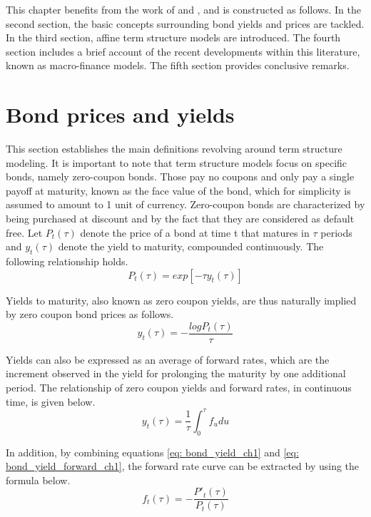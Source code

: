 This chapter benefits from the work of \cite{piazzesi_2010} and \cite{diebold_book}, and is constructed as follows. In the second section, the basic concepts surrounding bond yields and prices are tackled. In the third section, affine term structure models are introduced. The fourth section includes a brief account of the recent developments within this literature, known as macro-finance models. The fifth section provides conclusive remarks. 


\section{Bond prices and yields}

This section establishes the main definitions revolving around term structure modeling. It is important to note that term structure models focus on specific bonds, namely zero-coupon bonds. Those pay no coupons and only pay a single payoff at maturity, known as the face value of the bond, which for simplicity is assumed to amount to 1 unit of currency. Zero-coupon bonds are characterized by being purchased at discount and by the fact that they are considered as default free. Let \(P_t(\tau)\) denote the price of a bond at time t that matures in \(\tau\) periods and \(y_t(\tau)\) denote the yield to maturity, compounded continuously. The following relationship holds.
\begin{equation}
P_t\left(\tau\right)=exp\left[-\tau y_t(\tau)\right] \label{eq: bond_price_ch1}
\end{equation}  

Yields to maturity, also known as zero coupon yields, are thus naturally implied by zero coupon bond prices as follows.
\begin{equation}
y_t\left(\tau\right)=-\frac{log P_t\left(\tau\right)}{\tau} \label{eq: bond_yield_ch1}
\end{equation}

Yields can also be expressed as an average of forward rates, which are the increment observed in the yield for prolonging the maturity by one additional period. The relationship of zero coupon yields and forward rates, in continuous time, is given below.
\begin{equation}
y_t\left(\tau\right)=\frac{1}{\tau}\int^{\tau}_0f_udu \label{eq: bond_yield_forward_ch1}
\end{equation} 

In addition, by combining equations \ref{eq: bond_yield_ch1} and \ref{eq: bond_yield_forward_ch1}, the forward rate curve can be extracted by using the formula below.
\begin{equation}
f_t\left(\tau\right)=-\frac{P'_t\left(\tau\right)}{P_t\left(\tau\right)} \label{eq: forward_ch1}
\end{equation}

